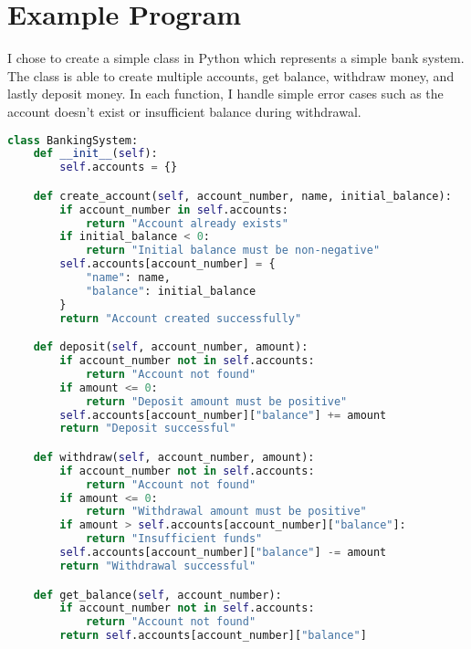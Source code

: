 \documentclass{article}
\begin{document}
\section{Example Program}
I chose to create a simple class in Python which represents a simple bank system. The class is able to create multiple accounts, get balance, withdraw money, and lastly deposit money. In each function, I handle simple error cases such as the account doesn't exist or insufficient balance during withdrawal. \\

\begin{lstlisting}[language=Python]
class BankingSystem:
    def __init__(self):
        self.accounts = {}

    def create_account(self, account_number, name, initial_balance):
        if account_number in self.accounts:
            return "Account already exists"
        if initial_balance < 0:
            return "Initial balance must be non-negative"
        self.accounts[account_number] = {
            "name": name,
            "balance": initial_balance
        }
        return "Account created successfully"

    def deposit(self, account_number, amount):
        if account_number not in self.accounts:
            return "Account not found"
        if amount <= 0:
            return "Deposit amount must be positive"
        self.accounts[account_number]["balance"] += amount
        return "Deposit successful"

    def withdraw(self, account_number, amount):
        if account_number not in self.accounts:
            return "Account not found"
        if amount <= 0:
            return "Withdrawal amount must be positive"
        if amount > self.accounts[account_number]["balance"]:
            return "Insufficient funds"
        self.accounts[account_number]["balance"] -= amount
        return "Withdrawal successful"

    def get_balance(self, account_number):
        if account_number not in self.accounts:
            return "Account not found"
        return self.accounts[account_number]["balance"]
\end{lstlisting}
\end{document}
